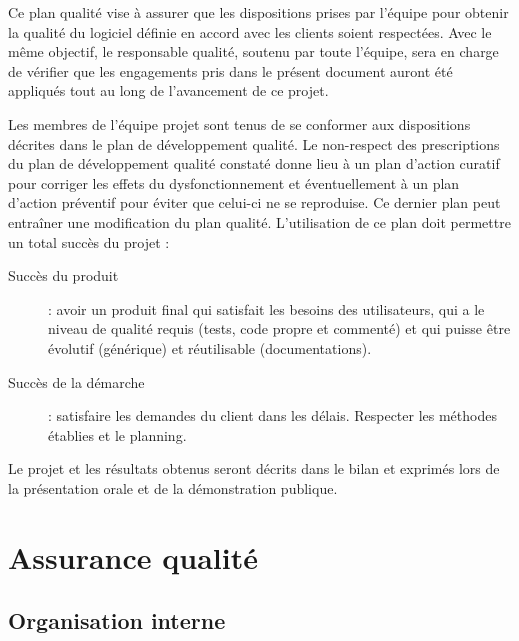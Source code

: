 \documentclass[10pt,a4paper]{article}
\begin{document}
Ce plan qualité vise à assurer que les dispositions prises par l’équipe pour obtenir la qualité du logiciel définie en accord avec les clients soient respectées. Avec le même objectif, le responsable qualité, soutenu par toute l’équipe, sera en charge de vérifier que les engagements pris dans le présent document auront été appliqués tout au long de l'avancement de ce projet.

Les membres de l'équipe projet sont tenus de se conformer aux dispositions décrites dans le plan de développement qualité. Le non-respect des prescriptions du plan de développement qualité constaté donne lieu à un plan d'action curatif pour corriger les effets du dysfonctionnement et éventuellement à un plan d'action préventif pour éviter que celui-ci ne se reproduise. Ce dernier plan peut entraîner une modification du plan qualité. L’utilisation de ce plan doit permettre un total succès du projet :

\begin{description}
\item [Succès du produit] : avoir un produit final qui satisfait les besoins des utilisateurs, qui a le niveau de qualité requis (tests, code propre et commenté) et qui puisse être évolutif (générique) et réutilisable (documentations).
\item [Succès de la démarche] : satisfaire les demandes du client dans les délais. Respecter les méthodes établies et le planning.
\end{description}

Le projet et les résultats obtenus seront décrits dans le bilan et exprimés lors de la présentation orale et de la démonstration publique. 


\newpage
\section{Assurance qualité}

\subsection{Organisation interne}
\end{document}
